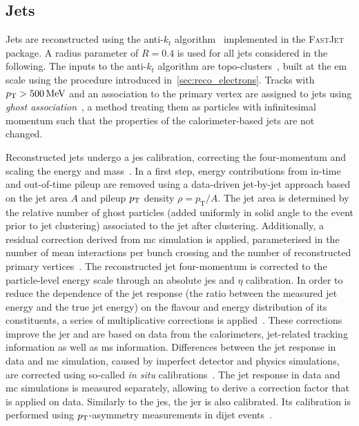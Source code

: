 \subsection{Jets}\label{sec:jets}

Jets are reconstructed using the anti-$k_t$ algorithm~\cite{Cacciari:2008gp} implemented in the \textsc{FastJet}~\cite{Fastjet,Cacciari:2006sm} package.
A radius parameter of $R=0.4$ is used for all jets considered in the following. The inputs to the anti-$k_t$ algorithm are topo-clusters~\cite{Aad:2020flx}, built at the \gls{em} scale using the procedure introduced in~\cref{sec:reco_electrons}.
Tracks with $\pt > \SI{500}{\MeV}$ and an association to the primary vertex are assigned to jets using \textit{ghost association}~\cite{Cacciari:2007fd}, a method treating them as particles with infinitesimal momentum such that the properties of the calorimeter-based jets are not changed. 


Reconstructed jets undergo a \gls{jes} calibration, correcting the four-momentum and scaling the energy and mass~\cite{Aad:2020flx}.
In a first step, energy contributions from in-time and out-of-time pileup are removed using a data-driven jet-by-jet approach based on the jet area $A$ and pileup $p_{\textrm{T}}$ density $\rho = p_\mathrm{T}/A$. The jet area is determined by the relative number of ghost particles (added uniformly in solid angle to the event prior to jet clustering) associated to the jet after clustering. 
Additionally, a residual correction derived from \gls{mc} simulation is applied, parameterised in the number of mean interactions per bunch crossing and the number of reconstructed primary vertices~\cite{Aad:2020flx,Cacciari:2007fd}.
The reconstructed jet four-momentum is corrected to the particle-level energy scale through an absolute \gls{jes} and $\eta$ calibration.
In order to reduce the dependence of the jet response (\ie the ratio between the measured jet energy and the true jet energy) on the flavour and energy distribution of its constituents, a series of multiplicative corrections is applied~\cite{PERF-2011-03}.
These corrections improve the \gls{jer} and are based on data from the calorimeters, jet-related tracking information as well as \gls{ms} information.
Differences between the jet response in data and \gls{mc} simulation, caused by imperfect detector and physics simulations, are corrected using so-called \textit{in situ} calibrations~\cite{Aad:2020flx}.
The jet response in data and \gls{mc} simulations is measured separately, allowing to derive a correction factor that is applied on data.
Similarly to the \gls{jes}, the \gls{jer} is also calibrated. Its calibration is performed using $p_{\textrm{T}}$-asymmetry measurements in dijet events~\cite{PERF-2014-02}.

